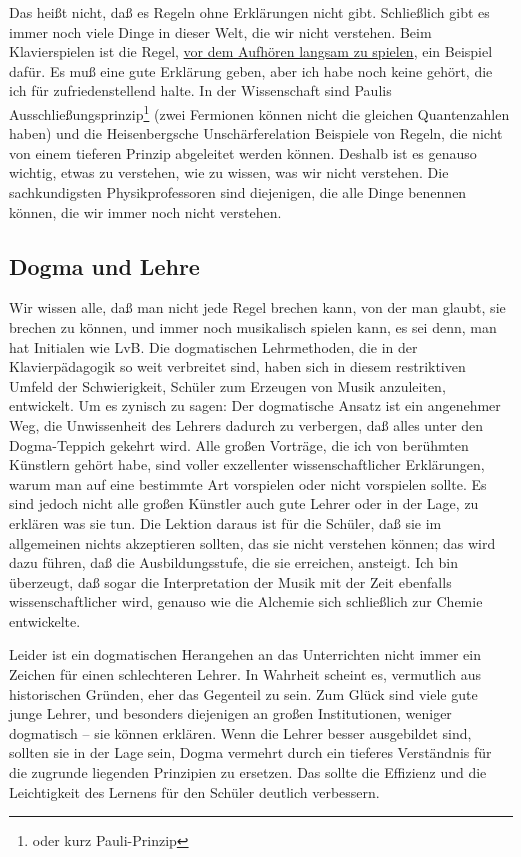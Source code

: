 Das heißt nicht, daß es Regeln ohne Erklärungen nicht gibt.
Schließlich gibt es immer noch viele Dinge in dieser Welt, die wir nicht verstehen.
Beim Klavierspielen ist die Regel, \hyperref[c1ii17]{vor dem Aufhören langsam zu spielen}, ein Beispiel dafür.
Es muß eine gute Erklärung geben, aber ich habe noch keine gehört, die ich für zufriedenstellend halte.
In der Wissenschaft sind Paulis Ausschließungsprinzip\footnote{oder kurz Pauli-Prinzip} (zwei Fermionen können nicht die gleichen Quantenzahlen haben) und die Heisenbergsche Unschärferelation Beispiele von Regeln, die nicht von einem tieferen Prinzip abgeleitet werden können.
Deshalb ist es genauso wichtig, etwas zu verstehen, wie zu wissen, was wir nicht verstehen.
Die sachkundigsten Physikprofessoren sind diejenigen, die alle Dinge benennen können, die wir immer noch nicht verstehen.


\subsection{Dogma und Lehre}
\label{c3_3g}

Wir wissen alle, daß man nicht jede Regel brechen kann, von der man glaubt, sie brechen zu können, und immer noch musikalisch spielen kann, es sei denn, man hat Initialen wie LvB.
Die dogmatischen Lehrmethoden, die in der Klavierpädagogik so weit verbreitet sind, haben sich in diesem restriktiven Umfeld der Schwierigkeit, Schüler zum Erzeugen von Musik anzuleiten, entwickelt.
Um es zynisch zu sagen: Der dogmatische Ansatz ist ein angenehmer Weg, die Unwissenheit des Lehrers dadurch zu verbergen, daß alles unter den Dogma-Teppich gekehrt wird.
Alle großen Vorträge, die ich von berühmten Künstlern gehört habe, sind voller exzellenter wissenschaftlicher Erklärungen, warum man auf eine bestimmte Art vorspielen oder nicht vorspielen sollte.
Es sind jedoch nicht alle großen Künstler auch gute Lehrer oder in der Lage, zu erklären was sie tun.
Die Lektion daraus ist für die Schüler, daß sie im allgemeinen nichts akzeptieren sollten, das sie nicht verstehen können; das wird dazu führen, daß die Ausbildungsstufe, die sie erreichen, ansteigt.
Ich bin überzeugt, daß sogar die Interpretation der Musik mit der Zeit ebenfalls wissenschaftlicher wird, genauso wie die Alchemie sich schließlich zur Chemie entwickelte.

Leider ist ein dogmatischen Herangehen an das Unterrichten nicht immer ein Zeichen für einen schlechteren Lehrer.
In Wahrheit scheint es, vermutlich aus historischen Gründen, eher das Gegenteil zu sein.
Zum Glück sind viele gute junge Lehrer, und besonders diejenigen an großen Institutionen, weniger dogmatisch -- sie können erklären.
Wenn die Lehrer besser ausgebildet sind, sollten sie in der Lage sein, Dogma vermehrt durch ein tieferes Verständnis für die zugrunde liegenden Prinzipien zu ersetzen.
Das sollte die Effizienz und die Leichtigkeit des Lernens für den Schüler deutlich verbessern.

